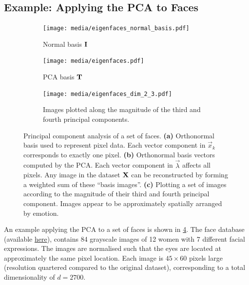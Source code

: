 \documentclass[10pt,letterpaper,oneside]{article}
\begin{document}
\subsection{Example: Applying the PCA to Faces}

\begin{figure}[p]
	\begin{subfigure}{0.5\textwidth}
		\centering
		\texttt{[image: media/eigenfaces\_normal\_basis.pdf]}
		\caption{Normal basis ${\mathbf{I}}$}
		\label{fig:eigenfaces_normal_basis}
	\end{subfigure}
	\begin{subfigure}{0.5\textwidth}
		\centering
		\texttt{[image: media/eigenfaces.pdf]}
		\caption{PCA basis ${\mathbf{T}}$}
		\label{fig:eigenfaces}
	\end{subfigure}
	\begin{subfigure}{\textwidth}
		\centering
		\texttt{[image: media/eigenfaces\_dim\_2\_3.pdf]}		
		\caption{Images plotted along the magnitude of the third and fourth principal components.}
		\label{fig:eigenfaces_dim_2_3}
	\end{subfigure}
	\caption{Principal component analysis of a set of faces. \textbf{(a)} Orthonormal basis used to represent pixel data. Each vector component in $\vec x_k$ corresponds to exactly one pixel. \textbf{(b)} Orthonormal basis vectors computed by the PCA. Each vector component in $\vec \lambda$ affects all pixels. Any image in the dataset ${\mathbf{X}}$ can be reconstructed by forming a weighted sum of these \enquote{basis images}. \textbf{(c)} Plotting a set of images according to the magnitude of their third and fourth principal component. Images appear to be approximately spatially arranged by emotion. }
	\label{fig:pca_faces}
\end{figure}

An example applying the PCA to a set of faces is shown in \cref{fig:pca_faces}. The face database (available \href{http://pics.stir.ac.uk/2D_face_sets.htm}{here}), contains 84 grayscale images of 12 women with 7 different facial expressions. The images are normalised such that the eyes are located at approximately the same pixel location. Each image is $45 \times 60$ pixels large (resolution quartered compared to the original dataset), corresponding to a total dimensionality of $d = 2700$.
\end{document}
